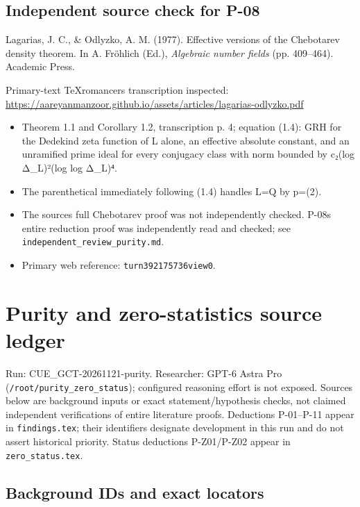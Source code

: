 \documentclass[11pt,a4paper]{article}
\providecommand{\tightlist}{\setlength{\itemsep}{0pt}\setlength{\parskip}{0pt}}
\theoremstyle{definition}\newtheorem{definition}{Definition}
\begin{document}
\subsection{Independent source check for
P-08}\label{independent-source-check-for-p-08}

Lagarias, J. C., \& Odlyzko, A. M. (1977). Effective versions of the
Chebotarev density theorem. In A. Fröhlich (Ed.), \emph{Algebraic number
fields} (pp. 409--464). Academic Press.

Primary-text TeXromancers transcription inspected:
\url{https://aareyanmanzoor.github.io/assets/articles/lagarias-odlyzko.pdf}

\begin{itemize}
\tightlist
\item
  Theorem 1.1 and Corollary 1.2, transcription p. 4; equation (1.4): GRH
  for the Dedekind zeta function of L alone, an effective absolute
  constant, and an unramified prime ideal for every conjugacy class with
  norm bounded by c₂(log Δ\_L)²(log log Δ\_L)⁴.
\item
  The parenthetical immediately following (1.4) handles L=Q by p=(2).
\item
  The source\textquotesingle s full Chebotarev proof was not
  independently checked. P-08\textquotesingle s entire reduction proof
  was independently read and checked; see
  \texttt{independent\_review\_purity.md}.
\item
  Primary web reference: \texttt{turn392175736view0}.
\end{itemize}
\section{Purity and zero-statistics source
ledger}\label{purity-and-zero-statistics-source-ledger}

Run: CUE\_GCT-20261121-purity. Researcher: GPT-6 Astra Pro
(\texttt{/root/purity\_zero\_status}); configured reasoning effort is
not exposed. Sources below are background inputs or exact
statement/hypothesis checks, not claimed independent verifications of
entire literature proofs. Deductions P-01--P-11 appear in
\texttt{findings.tex}; their identifiers designate development in this
run and do not assert historical priority. Status deductions P-Z01/P-Z02
appear in \texttt{zero\_status.tex}.

\subsection{Background IDs and exact
locators}\label{background-ids-and-exact-locators}
\end{document}
